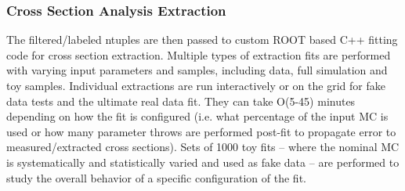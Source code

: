 \documentclass[../main-v1.tex]{subfiles}
\begin{document}
\subsubsection{Cross Section Analysis Extraction}

The filtered/labeled ntuples are then passed to custom  ROOT based C++ fitting code for cross section extraction. Multiple types of extraction fits are performed with varying input parameters and samples, including data, full simulation and toy samples.  
Individual extractions are run interactively or on the grid for fake data tests and the ultimate real data fit. They can take O(5-45) minutes depending on how the fit is configured (i.e. what percentage of the input MC is used or how many parameter throws are performed post-fit to propagate error to measured/extracted cross sections). Sets of 1000 toy fits – where the nominal MC is systematically and statistically varied and used as fake data – are performed to study the overall behavior of a specific configuration of the fit.










\end{document}
